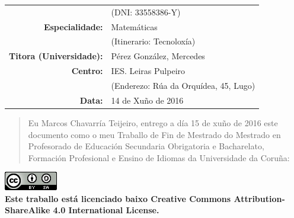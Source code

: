 \begin{titlepage}
\begin{bottompar}
\begin{flushright}
\begin{tabular}{rl}
        & \small{(DNI: 33558386-Y)} \\

        \large{\textbf{Especialidade:}}
        & \large{Matemáticas} \\

        & \small{(Itinerario: Tecnoloxía)} \\


        \large{\textbf{Titora (Universidade):}}
        & \large{Pérez González, Mercedes} \\

        \large{\textbf{Centro:}}
        & \large{IES. Leiras Pulpeiro} \\

        & \small{(Enderezo: Rúa da Orquídea, 45, Lugo)} \\

        \large{\textbf{Data:}}
        & \large{14 de Xuño de 2016} \\
      \end{tabular}
    \end{flushright}
  \end{bottompar}

    \newpage

    \begin{center}
        \begin{quote}
            \centering
            Eu Marcos Chavarría Teijeiro, entrego a día 15 de xuño de 2016 este documento como o meu Traballo de Fin de Mestrado do Mestrado en Profesorado de Educación Secundaria Obrigatoria e Bacharelato, Formación Profesional e Ensino de Idiomas da Universidade da Coruña:
        \end{quote}

        \begin{bottompar}
          \includegraphics{img/cclicence.png} \\

          \textbf{Este traballo está licenciado baixo Creative Commons Attribution-ShareAlike 4.0 International License.}
        \end{bottompar}
    \end{center}

\end{titlepage}
